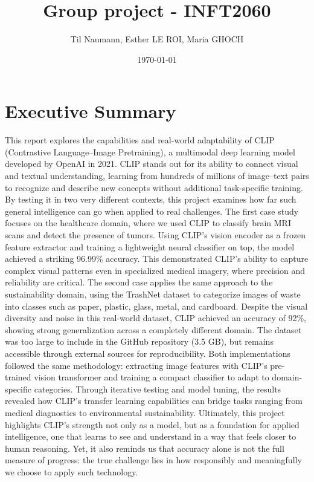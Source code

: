 \documentclass[12pt]{article}
\title{Group project - INFT2060}
\author{Til Naumann, Esther LE ROI, Maria GHOCH}
\date{\today}
\begin{document}
\maketitle
\newpage

\tableofcontents
\newpage

\section*{Executive Summary}
This report explores the capabilities and real-world adaptability of CLIP (Contrastive Language–Image Pretraining), a multimodal deep learning model developed by OpenAI in 2021. CLIP stands out for its ability to connect visual and textual understanding, learning from hundreds of millions of image–text pairs to recognize and describe new concepts without additional task-specific training. By testing it in two very different contexts, this project examines how far such general intelligence can go when applied to real challenges.
The first case study focuses on the healthcare domain, where we used CLIP to classify brain MRI scans and detect the presence of tumors. Using CLIP’s vision encoder as a frozen feature extractor and training a lightweight neural classifier on top, the model achieved a striking 96.99\% accuracy. This demonstrated CLIP’s ability to capture complex visual patterns even in specialized medical imagery, where precision and reliability are critical.
The second case applies the same approach to the sustainability domain, using the TrashNet dataset to categorize images of waste into classes such as paper, plastic, glass, metal, and cardboard. Despite the visual diversity and noise in this real-world dataset, CLIP achieved an accuracy of 92\%, showing strong generalization across a completely different domain. The dataset was too large to include in the GitHub repository (3.5 GB), but remains accessible through external sources for reproducibility.
Both implementations followed the same methodology: extracting image features with CLIP’s pre-trained vision transformer and training a compact classifier to adapt to domain-specific categories. Through iterative testing and model tuning, the results revealed how CLIP’s transfer learning capabilities can bridge tasks ranging from medical diagnostics to environmental sustainability.
Ultimately, this project highlights CLIP’s strength not only as a model, but as a foundation for applied intelligence, one that learns to see and understand in a way that feels closer to human reasoning. Yet, it also reminds us that accuracy alone is not the full measure of progress: the true challenge lies in how responsibly and meaningfully we choose to apply such technology.
\newpage
\end{document}
